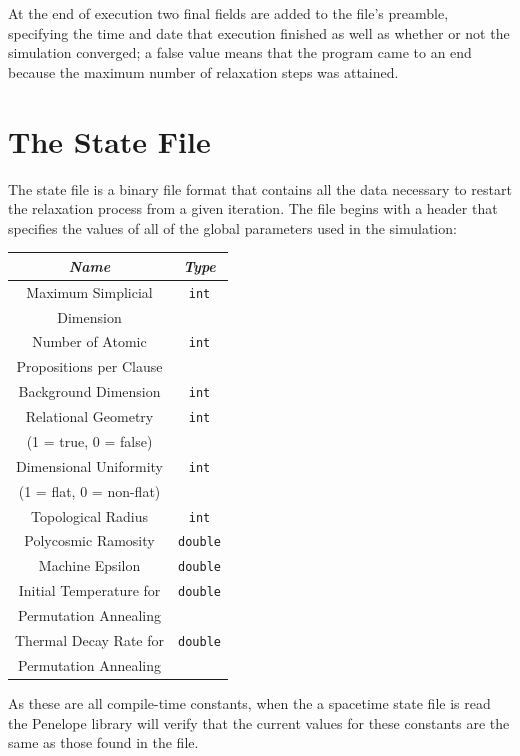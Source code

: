 \documentclass[12pt,letterpaper]{report}
\begin{document}
At the end of execution two final fields are added to the file's preamble, specifying the time and date 
that execution finished as well as whether or not the simulation converged; a false value means that the 
program came to an end because the maximum number of relaxation steps was attained. 
   
\section{The State File}

The state file is a binary file format that contains all the data necessary to restart the relaxation 
process from a given iteration. The file begins with a header that specifies the values of all of the 
global parameters used in the simulation:
\begin{center}
\begin{tabular}{|c|c|}
\hline 
\emph{Name} & \emph{Type} \\ \hline
Maximum Simplicial & \texttt{int}\\
Dimension & \\ \hline
Number of Atomic & \texttt{int} \\
Propositions per Clause & \\ \hline
Background Dimension & \texttt{int} \\ \hline
Relational Geometry & \texttt{int} \\
(1 = true, 0 = false) & \\ \hline
Dimensional Uniformity & \texttt{int} \\ 
(1 = flat, 0 = non-flat) & \\ \hline
Topological Radius & \texttt{int} \\ \hline 
Polycosmic Ramosity & \texttt{double} \\ \hline 
Machine Epsilon  & \texttt{double} \\ \hline
Initial Temperature for & \texttt{double} \\ 
Permutation Annealing & \\ \hline
Thermal Decay Rate for & \texttt{double} \\ 
Permutation Annealing & \\ \hline 
\end{tabular} 
\end{center}
As these are all compile-time constants, when the a spacetime state file is read the Penelope library will 
verify that the current values for these constants are the same as those found in the file.   
\end{document}
